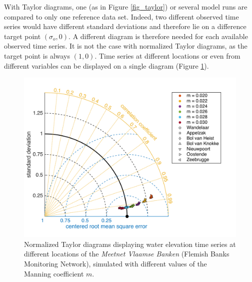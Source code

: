\documentclass{article}
\begin{document}
With Taylor diagrams, one (as in Figure \ref{fig_taylor}) or several model runs are compared to only one reference data set. Indeed, two different observed time series would have different standard deviations and therefore lie on a difference target point $(\sigma_o, 0)$. A different diagram is therefore needed for each available observed time series. It is not the case with normalized Taylor diagrams, as the target point is always $(1, 0)$. Time series at different locations or even from different variables can be displayed on a single diagram (Figure \ref{fig_norm_taylor}).

\begin{figure}
  \centering
  \includegraphics[width = \textwidth]{figures/norm_taylor.png}
  \caption{Normalized Taylor diagrams displaying water elevation time series at different locations of the \textit{Meetnet Vlaamse Banken} (Flemish Banks Monitoring Network), simulated with different values of the Manning coefficient $m$.}
  \label{fig_norm_taylor}
\end{figure}



\end{document}
